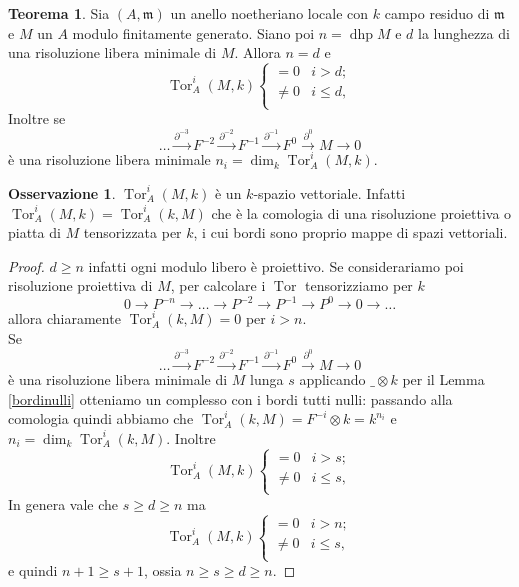 \documentclass[a4paper,11pt,oneside]{book}
\newcommand{\m}{\mathfrak{m}}
\DeclareMathOperator{\Tor}{Tor}
\DeclareMathOperator{\dhp}{dhp}
\theoremstyle{definition}
\newtheorem{teo}[section]{Teorema}
\newtheorem{oss}[section]{Osservazione}
\begin{document}
  \begin{teo}\label{teo:dhploc}
  Sia $(A,\m)$ un anello noetheriano locale con $k$ campo residuo di $\m$ e $M$ un $A$ modulo finitamente generato. Siano poi 
  $n=\dhp M$ e $d$ la lunghezza di una risoluzione libera minimale di $M$. Allora $n=d$ e 
  \[
   \Tor^i_A(M,k)
   \begin{cases}
    =0 & i>d;\\
    \neq 0 & i\leq d,\\
   \end{cases}
  \]
  Inoltre se 
  \[
    \dots\xrightarrow{\partial^{-3}} F^{-2}\xrightarrow{\partial^{-2}} F^{-1}\xrightarrow{\partial^{-1}}F^0\xrightarrow{\partial^{0}} M\rightarrow 0
  \]
  \`e una risoluzione libera minimale $n_i=\dim_k \Tor^i_A(M,k)$.
  \end{teo}

  \begin{oss}
   $\Tor^i_A(M,k)$ \`e un $k$-spazio vettoriale. Infatti $\Tor^i_A(M,k)=\Tor^i_A(k,M)$ che \`e la comologia di una risoluzione proiettiva o 
   piatta di $M$ tensorizzata per $k$, i cui bordi sono proprio mappe di spazi vettoriali.
  \end{oss}

  \begin{proof}\*
   $d\geq n$ infatti ogni modulo libero \`e proiettivo. Se considerariamo poi  risoluzione proiettiva di $M$, per calcolare i $\Tor$ tensorizziamo per $k$
       \[ 
 	0 \rightarrow P^{-n}\rightarrow \dots \rightarrow P^{-2} \rightarrow P^{-1} \rightarrow  P^{0} \rightarrow 0 \rightarrow \dots
       \]
       allora chiaramente  $\Tor^i_A(k,M)=0$ per $i>n$.\\
       Se 
       \[
      \dots\xrightarrow{\partial^{-3}} F^{-2}\xrightarrow{\partial^{-2}} F^{-1}\xrightarrow{\partial^{-1}}F^0\xrightarrow{\partial^{0}} M\rightarrow 0
	\]
       \`e una risoluzione libera minimale di $M$ lunga $s$ applicando $\_\otimes k$ per il Lemma \ref{bordinulli} otteniamo un complesso con i bordi tutti nulli: passando
       alla comologia quindi abbiamo che $\Tor^i_A(k,M)=F^{-i}\otimes k=k^{n_i}$ e $n_i=\dim_k\Tor^i_A(k,M)$. Inoltre
       \[
	  \Tor^i_A(M,k)
	  \begin{cases}
	    =0 & i>s;\\
	    \neq 0 & i\leq s,\\
	  \end{cases}
	\]
	In genera vale che $s\geq d\geq n$ ma 
	\[
	  \Tor^i_A(M,k)
	  \begin{cases}
	    =0 & i>n;\\
	    \neq 0 & i\leq s,\\
	  \end{cases}
	\]
	e quindi $n+1\geq s+1$, ossia $n\geq s\geq d\geq n$. 
  \end{proof}
  
\end{document}
